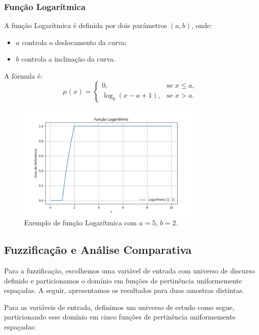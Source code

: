 \documentclass[a4paper,12pt]{article}
\begin{document}
\subsubsection{Função Logarítmica}
A função Logarítmica é definida por dois parâmetros $(a, b)$, onde:
\begin{itemize}
    \item $a$ controla o deslocamento da curva;
    \item $b$ controla a inclinação da curva.
\end{itemize}
A fórmula é:
\[
\mu(x) = 
\begin{cases}
0, & \text{se } x \leq a, \\
\log_b(x - a + 1), & \text{se } x > a.
\end{cases}
\]
\begin{figure}[H]
    \centering
    \includegraphics[width=0.8\textwidth]{img/logarithmic.png}
    \caption{Exemplo de função Logarítmica com $a=5$, $b=2$.}
    \label{fig:funcao_logaritmica}
\end{figure}


\subsection{Fuzzificação e Análise Comparativa}

Para a fuzzificação, escolhemos uma variável de entrada com universo de discurso definido e particionamos o domínio em funções de pertinência uniformemente espaçadas. A seguir, apresentamos os resultados para duas amostras distintas.

Para as variáveis de entrada, definimos um universo de estudo como segue, particionando esse domínio em cinco funções de pertinência uniformemente espaçadas:
\end{document}
